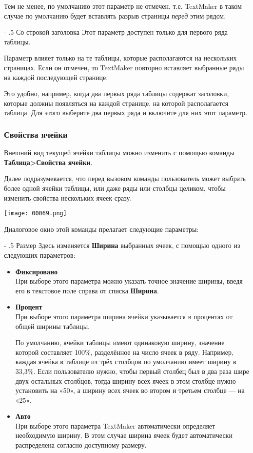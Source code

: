 \documentclass[a4paper,10pt]{article}
\makeatletter
\renewcommand\paragraph{%
   \@startsection{paragraph}{4}{0mm}%
      {-\baselineskip}%
      {.5\baselineskip}%
      {\normalfont\normalsize\bfseries}}
\makeatother
\begin{document}
Тем не менее, по умолчанию этот параметр не отмечен, т.е. TextMaker в таком случае по умолчанию будет вставлять разрыв страницы \textit{перед} этим рядом.

\paragraph{Со строкой заголовка}
Этот параметр доступен только для первого ряда таблицы.

Параметр влияет только на те таблицы, которые располагаются на нескольких страницах. Если он отмечен, то TextMaker повторно вставляет выбранные ряды на каждой последующей странице.

Это удобно, например, когда два первых ряда таблицы содержат заголовки, которые должны появляться на каждой странице, на которой располагается таблица. Для этого выберите два первых ряда и включите для них этот параметр.

\subsubsection{Свойства ячейки}
Внешний вид текущей ячейки таблицы можно изменить с помощью команды \textbf{Таблица>Свойства ячейки}.

Далее подразумевается, что перед вызовом команды пользователь может выбрать более одной ячейки таблицы, или даже ряды или столбцы целиком, чтобы изменить свойства нескольких ячеек сразу.

\texttt{[image: 00069.png]}

Диалоговое окно этой команды прелагает следующие параметры:

\paragraph{Размер}
Здесь изменяется \textbf{Ширина} выбранных ячеек, с помощью одного из следующих параметров:
\begin{itemize}
 \item \textbf{Фиксировано}\\
 При выборе этого параметра можно указать точное значение ширины, введя его в текстовое поле справа от списка \textbf{Ширина}.
 \item \textbf{Процент}\\
 При выборе этого параметра ширина ячейки указывается в процентах от общей ширины таблицы.
 
 По умолчанию, ячейки таблицы имеют одинаковую ширину, значение которой составляет 100\%, разделённое на число ячеек в ряду. Например, каждая ячейка в таблице из трёх столбцов по умолчанию имеет ширину в 33,3\%. Если пользователю нужно, чтобы первый столбец был в два раза шире двух остальных столбцов, тогда ширину всех ячеек в этом столбце нужно установить на «50», а ширину всех ячеек во втором и третьем столбце --- на «25».
 \item \textbf{Авто}\\
 При выборе этого параметра TextMaker автоматически определяет необходимую ширину. В этом случае ширина ячеек будет автоматически распределена согласно доступному размеру.
\end{itemize}
\end{document}
